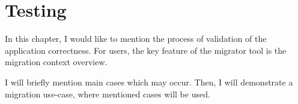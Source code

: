 \chapter{Testing}\label{cptr:testing}

In this chapter, I would like to mention the process of validation of the application correctness.
For users, the key feature of the migrator tool is the migration context overview.

I will briefly mention main cases which may occur.
Then, I will demonstrate a migration use-case, where mentioned cases will be used.




